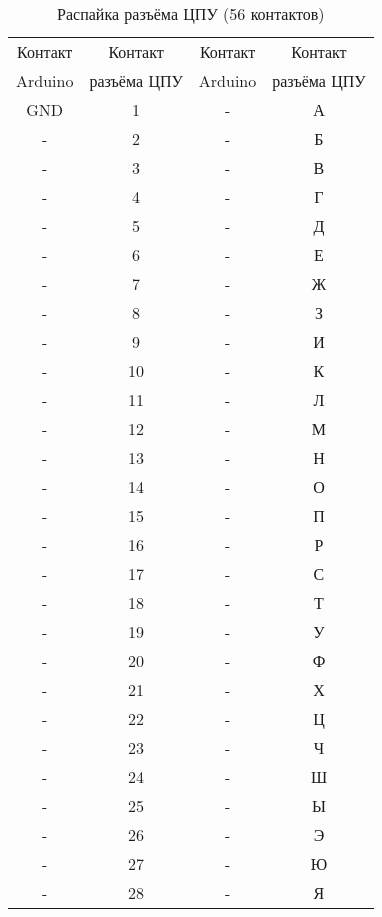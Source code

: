 \documentclass[10pt, a4paper, twocolumn]{article}
\begin{document}
\begin{table*}
\begin{center}
\caption{Распайка разъёма ЦПУ (56 контактов)}
\begin{tabular}{cccc}
\hline \hline
Контакт & Контакт & Контакт & Контакт \\
Arduino & разъёма ЦПУ & Arduino & разъёма ЦПУ \\
\hline
GND & 1 & - & А \\
- & 2 & - & Б \\
- & 3 & - & В \\
- & 4 & - & Г \\
- & 5 & - & Д \\
- & 6 & - & Е \\
- & 7 & - & Ж \\
- & 8 & - & З \\
- & 9 & - & И \\
- & 10 & - & К \\
- & 11 & - & Л \\
- & 12 & - & М \\
- & 13 & - & Н \\
- & 14 & - & О \\
- & 15 & - & П \\
- & 16 & - & Р \\
- & 17 & - & С \\
- & 18 & - & Т \\
- & 19 & - & У \\
- & 20 & - & Ф \\
- & 21 & - & Х \\
- & 22 & - & Ц \\
- & 23 & - & Ч \\
- & 24 & - & Ш \\
- & 25 & - & Ы \\
- & 26 & - & Э \\
- & 27 & - & Ю \\
- & 28 & - & Я \\
\hline \hline
\end{tabular}
\label{tab_cpu_wires}
\end{center}
\end{table*}
\end{document}
